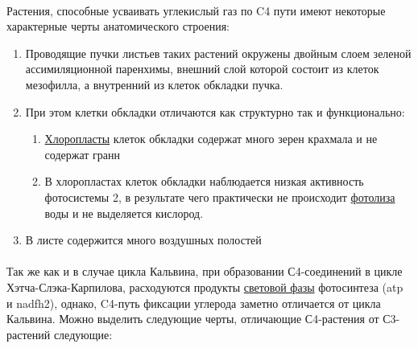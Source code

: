 
\paragraph*{}Растения, способные усваивать углекислый газ по C4 пути имеют некоторые характерные черты анатомического строения:

\begin{enumerate}
	\item Проводящие пучки листьев таких растений окружены двойным слоем зеленой ассимиляционной паренхимы, внешний слой которой состоит из клеток мезофилла, а внутренний из клеток обкладки пучка. 
	\item При этом клетки обкладки отличаются как структурно так и функционально:
	\begin{enumerate}
	
		\item \hyperlink{cell_plastids}{Хлоропласты} клеток обкладки содержат много зерен крахмала и не содержат гранн
		\item В хлоропластах клеток обкладки наблюдается низкая активность фотосистемы 2, в результате чего практически не происходит \hyperlink{photolisys}{фотолиза} воды и не выделяется кислород.
	
	\end{enumerate}	 
		
	\item В листе содержится много воздушных полостей
	
\end{enumerate}

\paragraph*{}Так же как и в случае цикла Кальвина, при образовании С4-соединений в цикле Хэтча-Слэка-Карпилова, расходуются продукты \hyperlink{light_stage}{световой фазы} фотосинтеза (\gls{atp} и \gls{nadfh2}), однако, C4-путь фиксации углерода заметно отличается от цикла Кальвина. Можно выделить следующие черты, отличающие С4-растения от С3-растений следующие: 

